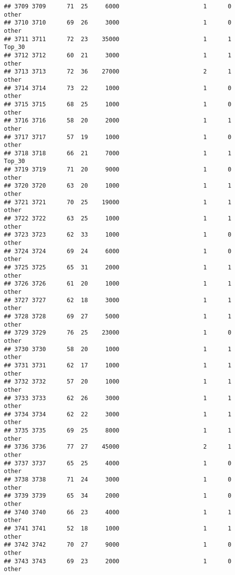 \documentclass[
]{article}
\begin{document}
\begin{verbatim}
## 3709 3709      71  25     6000                        1      0    other
## 3710 3710      69  26     3000                        1      0    other
## 3711 3711      72  23    35000                        1      1   Top_30
## 3712 3712      60  21     3000                        1      1    other
## 3713 3713      72  36    27000                        2      1    other
## 3714 3714      73  22     1000                        1      0    other
## 3715 3715      68  25     1000                        1      0    other
## 3716 3716      58  20     2000                        1      1    other
## 3717 3717      57  19     1000                        1      0    other
## 3718 3718      66  21     7000                        1      1   Top_30
## 3719 3719      71  20     9000                        1      0    other
## 3720 3720      63  20     1000                        1      1    other
## 3721 3721      70  25    19000                        1      1    other
## 3722 3722      63  25     1000                        1      1    other
## 3723 3723      62  33     1000                        1      0    other
## 3724 3724      69  24     6000                        1      0    other
## 3725 3725      65  31     2000                        1      1    other
## 3726 3726      61  20     1000                        1      1    other
## 3727 3727      62  18     3000                        1      1    other
## 3728 3728      69  27     5000                        1      1    other
## 3729 3729      76  25    23000                        1      0    other
## 3730 3730      58  20     1000                        1      1    other
## 3731 3731      62  17     1000                        1      1    other
## 3732 3732      57  20     1000                        1      1    other
## 3733 3733      62  26     3000                        1      1    other
## 3734 3734      62  22     3000                        1      1    other
## 3735 3735      69  25     8000                        1      1    other
## 3736 3736      77  27    45000                        2      1    other
## 3737 3737      65  25     4000                        1      0    other
## 3738 3738      71  24     3000                        1      0    other
## 3739 3739      65  34     2000                        1      0    other
## 3740 3740      66  23     4000                        1      1    other
## 3741 3741      52  18     1000                        1      1    other
## 3742 3742      70  27     9000                        1      0    other
## 3743 3743      69  23     2000                        1      0    other

\end{verbatim}
\end{document}
